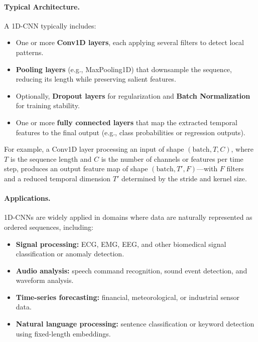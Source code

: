 \documentclass[12pt,a4paper]{report}
\begin{document}
\vspace{1em}
\paragraph{Typical Architecture.}
A 1D-CNN typically includes:
\begin{itemize}
    \item One or more \textbf{Conv1D layers}, each applying several filters to detect local patterns.
    \item \textbf{Pooling layers} (e.g., MaxPooling1D) that downsample the sequence, reducing its length while preserving salient features.
    \item Optionally, \textbf{Dropout layers} for regularization and \textbf{Batch Normalization} for training stability.
    \item One or more \textbf{fully connected layers} that map the extracted temporal features to the final output (e.g., class probabilities or regression outputs).
\end{itemize}

\vspace{0.5em}
For example, a Conv1D layer processing an input of shape $(\text{batch}, T, C)$, where $T$ is the sequence length and $C$ is the number of channels or features per time step, produces an output feature map of shape $(\text{batch}, T', F)$—with $F$ filters and a reduced temporal dimension $T'$ determined by the stride and kernel size.

\vspace{1em}
\paragraph{Applications.}
1D-CNNs are widely applied in domains where data are naturally represented as ordered sequences, including:
\begin{itemize}
    \item \textbf{Signal processing:} ECG, EMG, EEG, and other biomedical signal classification or anomaly detection.
    \item \textbf{Audio analysis:} speech command recognition, sound event detection, and waveform analysis.
    \item \textbf{Time-series forecasting:} financial, meteorological, or industrial sensor data.
    \item \textbf{Natural language processing:} sentence classification or keyword detection using fixed-length embeddings.
\end{itemize}
\end{document}
